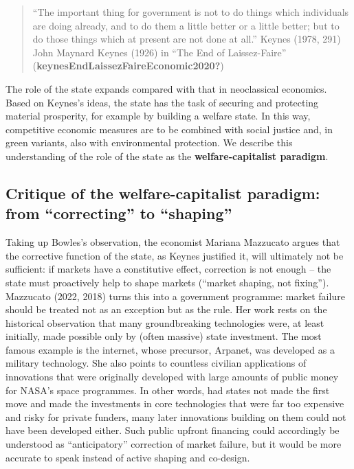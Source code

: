 \documentclass[
  british,
  a4paper,
  DIV=11,
  numbers=noendperiod,
  oneside,
  openany]{scrreprt}
\begin{document}
\begin{quote}
``The important thing for government is not to do things which
individuals are doing already, and to do them a little better or a
little better; but to do those things which at present are not done at
all.'' Keynes (1978, 291) John Maynard Keynes (1926) in ``The End of
Laissez-Faire'' (\textbf{keynesEndLaissezFaireEconomic2020?})
\end{quote}

The role of the state expands compared with that in neoclassical
economics. Based on Keynes's ideas, the state has the task of securing
and protecting material prosperity, for example by building a welfare
state. In this way, competitive economic measures are to be combined
with social justice and, in green variants, also with environmental
protection. We describe this understanding of the role of the state as
the \textbf{welfare-capitalist paradigm}.

\subsection{Critique of the welfare-capitalist paradigm: from
``correcting'' to
``shaping''}\label{critique-of-the-welfare-capitalist-paradigm-from-correcting-to-shaping}

Taking up Bowles's observation, the economist Mariana Mazzucato argues
that the corrective function of the state, as Keynes justified it, will
ultimately not be sufficient: if markets have a constitutive effect,
correction is not enough -- the state must proactively help to shape
markets (``market shaping, not fixing''). Mazzucato (2022, 2018) turns
this into a government programme: market failure should be treated not
as an exception but as the rule. Her work rests on the historical
observation that many groundbreaking technologies were, at least
initially, made possible only by (often massive) state investment. The
most famous example is the internet, whose precursor, Arpanet, was
developed as a military technology. She also points to countless
civilian applications of innovations that were originally developed with
large amounts of public money for NASA's space programmes. In other
words, had states not made the first move and made the investments in
core technologies that were far too expensive and risky for private
funders, many later innovations building on them could not have been
developed either. Such public upfront financing could accordingly be
understood as ``anticipatory'' correction of market failure, but it
would be more accurate to speak instead of active shaping and co-design.
\end{document}
